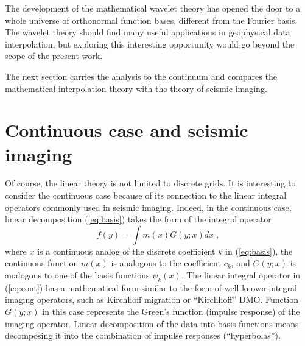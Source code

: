 
The development of the mathematical wavelet theory \cite[]{wavelet} has
opened the door to a whole universe of orthonormal function bases,
different from the Fourier basis. The wavelet theory should find many
useful applications in geophysical data interpolation, but exploring
this interesting opportunity would go beyond the scope of the present
work.

The next section carries the analysis to the continuum and compares
the mathematical interpolation theory with the theory of seismic
imaging.

\section{Continuous case and seismic imaging}
Of course, the linear theory is not limited to discrete grids.  It is
interesting to consider the continuous case because of its connection
to the linear integral operators commonly used in seismic imaging.
Indeed, in the continuous case, linear decomposition (\ref{eq:basis})
takes the form of the integral operator
\begin{equation}\label{eq:cont}
 f (y) = \int m (x) G (y; x) d x \;,
\end{equation}
where $x$ is a continuous analog of the discrete coefficient $k$ in
(\ref{eq:basis}), the continuous function $m (x)$ is analogous to the
coefficient $c_k$, and $G (y; x)$ is analogous to one of the basis
functions $\psi_k (x)$. The linear integral operator in
(\ref{eq:cont}) has a mathematical form similar to the form of
well-known integral imaging operators, such as Kirchhoff migration or
``Kirchhoff'' DMO. Function $G (y; x)$ in this case represents the
Green's function (impulse response) of the imaging operator.  Linear
decomposition of the data into basis functions means decomposing it
into the combination of impulse responses (``hyperbolas'').

